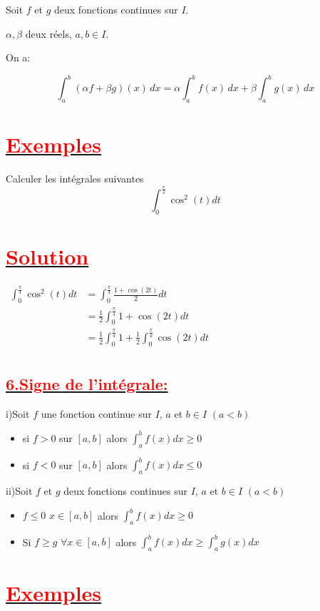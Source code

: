 \documentclass[12pt]{article}
\begin{document}
Soit \( f \) et \( g \) deux fonctions continues sur \( I \). 

\( \alpha, \beta \) deux réels,  \( a, b \in I \).

On a:

\[
\boxed{\int_a^b \left( \alpha f + \beta g \right)(x) \, dx = \alpha \int_a^b f(x) \, dx + \beta \int_a^b g(x) \, dx}
\]

\section*{\underline{\textbf{\textcolor{red}{Exemples}}}}
Calculer les intégrales suivantes
\[ \int_0^{\frac{\pi}{4}}\cos^{2}(t)dt\]
\section*{\underline{\textbf{\textcolor{red}{Solution}}}}
\( 
\begin{aligned} 
\int_0^{\frac{\pi}{4}}\cos^{2}(t)dt &=\int_0^{\frac{\pi}{4}}\frac{1+\cos(2t)}{2}dt \\
&=\frac{1}{2}\int_0^{\frac{\pi}{4}}1+\cos(2t)dt \\
&=\frac{1}{2}\int_0^{\frac{\pi}{4}}1+\frac{1}{2}\int_0^{\frac{\pi}{4}}\cos(2t)dt \\
\end{aligned}
\)
\subsection*{\underline{\textbf{\textcolor{red}{6.Signe de l'intégrale:}}}}
i)Soit $f$ une fonction continue sur $I$, $a$ et $b\in I$  $(a<b)$
\begin{itemize}
\item si $f>0$ sur $[a,b]$ alors $\int_a^b f(x)dx \geq 0$
\item si $f<0$ sur $[a,b]$ alors $\int_a^b f(x)dx \leq 0$
\end{itemize}
ii)Soit $f$ et $g$ deux fonctions continues sur $I$, $a$ et $b\in I$  $(a<b)$
\begin{itemize}
\item $ f \leq 0 $ $x\in[a,b]$ alors $\int_a^b f(x)dx \geq 0$
\item Si $f \geq	 g$ $\forall x \in[a,b]$ alors $ \int_a^b f(x)dx \geq \int_a^b g(x)dx$
\end{itemize}
\section*{\underline{\textbf{\textcolor{red}{Exemples}}}}
\end{document}
